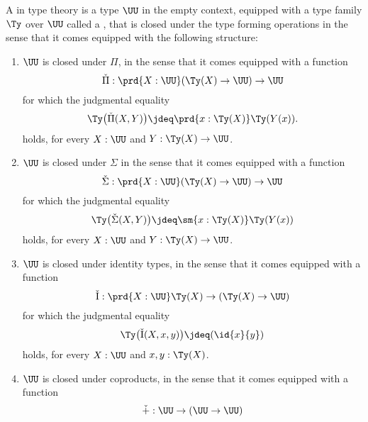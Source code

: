 \begin{defn}\label{defn:universe}
  A  in type theory is a type $\UU$ in the empty context, equipped with a type family $\Ty$ over $\UU$ called a , that is closed under the type forming operations in the sense that it comes equipped with the following structure:
  \begin{enumerate}
  \item $\UU$ is closed under $\Pi$, in the sense that it comes equipped with a function
    \begin{equation*}
      \check{\Pi} :\prd{X:\UU}(\Ty(X)\to\UU)\to\UU
    \end{equation*}
    for which the judgmental equality
    \begin{equation*}
      \Ty\big(\check{\Pi}(X,Y)\big)\jdeq \prd{x:\Ty(X)}\Ty(Y(x)).
    \end{equation*}
    holds, for every $X:\UU$ and $Y:\Ty(X)\to\UU$.
  \item $\UU$ is closed under $\Sigma$ in the sense that it comes equipped with a function
    \begin{equation*}
      \check{\Sigma} :\prd{X:\UU}(\Ty(X)\to\UU)\to\UU
    \end{equation*}
    for which the judgmental equality
    \begin{equation*}
      \Ty\big(\check{\Sigma}(X,Y)\big) \jdeq \sm{x:\Ty(X)}\Ty(Y(x))
    \end{equation*}
    holds, for every $X:\UU$ and $Y:\Ty(X)\to\UU$.
  \item $\UU$ is closed under identity types, in the sense that it comes equipped with a function
    \begin{equation*}
      \check{\mathrm{I}} : \prd{X:\UU}\Ty(X)\to(\Ty(X)\to\UU)
    \end{equation*}
    for which the judgmental equality
    \begin{equation*}
      \Ty\big(\check{\mathrm{I}}(X,x,y)\big)\jdeq (\id{x}{y})
    \end{equation*}
    holds, for every $X:\UU$ and $x,y:\Ty(X)$.
  \item $\UU$ is closed under coproducts, in the sense that it comes equipped with a function
    \begin{equation*}
      \mathbin{\check{+}}:\UU\to (\UU\to\UU)

\end{equation*}
\end{enumerate}
\end{defn}
